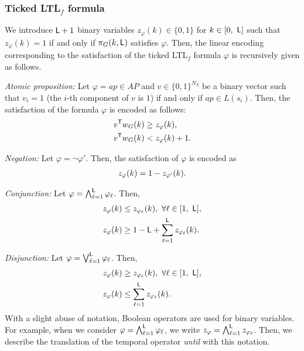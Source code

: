 \documentclass[journal,twoside,web]{IEEEtran}
\newcommand{\req}[1]{\eqref{#1}}
\newcommand{\Len}{{\sf L}}
\begin{document}
%
\subsubsection{Ticked LTL$_f$ formula}\label{encLTL}
%   
We introduce $\Len+1$ binary variables $z_{\varphi}(k) \in \{0,1\}$ for $k \in [0,\ \Len]$ such that $z_{\varphi}(k)=1$ if and only if $\pi_G (k, \Len)$ satisfies $\varphi$.
Then, the linear encoding corresponding to the satisfaction of  the ticked LTL$_f$ formula $\varphi$ is recursively given as follows.
%
%

\textit{Atomic proposition:} Let $\varphi = ap \in AP$ and $v \in \{0, 1\}^{N_S}$ be a binary vector such that $v_i = 1$ (the $i$-th component of $v$ is $1$) if and only if $ap \in L(s_i)$. Then, the satisfaction of the formula $\varphi$ is encoded as follows: 
\begin{align}
v^\mathsf{T} {w_G}(k) &\geq z_\varphi (k),\notag\\
v^\mathsf{T} {w_G}(k) &< z_\varphi (k)+1. \notag
\end{align}

\textit{Negation:} Let $\varphi = \neg \varphi'$. Then, the satisfaction of $\varphi$ is encoded as 
\begin{align}\notag
z_\varphi (k) = 1 - z_{\varphi'} (k). 
\end{align}

\textit{Conjunction:} Let $\varphi = \bigwedge^{\Len} _{\ell=1} \varphi_\ell$. Then, 
\begin{align}
\label{translate_con}
z_\varphi (k) &\leq z_{\varphi_\ell} (k),\ \forall \ell \in [1,\ \Len], \notag \\ 
z_\varphi (k) & \geq 1-\Len + \sum_{\ell=1}^{\Len} z_{\varphi_\ell} (k). \notag
\end{align}

\textit{Disjunction:} Let $\varphi = \bigvee^{\Len} _{\ell=1} \varphi_\ell$. 
Then, 
\begin{align}
z_\varphi (k) &\geq z_{\varphi_\ell} (k),\ \forall \ell \in [1,\ \Len], \notag \\ 
z_\varphi (k) & \leq \sum_{\ell=1}^{\Len} z_{\varphi_\ell} (k). \notag
\end{align}
With a slight abuse of notation, Boolean operators are used for binary variables. For example, when we consider $\varphi = \bigwedge^\Len _{\ell=1} \varphi_\ell$, we write $z_\varphi = \bigwedge^{\Len} _{\ell=1} z_{\varphi_\ell}$. %
Then, we describe the translation of the temporal operator \textit{until} with this notation.
\end{document}
